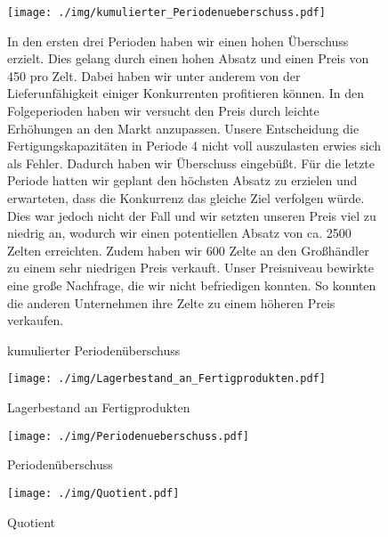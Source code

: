 \documentclass[a4paper, 12pt]{report}
\begin{document}
\begin{flushleft}
 \begin{figure}
 \centering 
 \texttt{[image: ./img/kumulierter\_Periodenueberschuss.pdf]}
  \caption[kumulierter Periodenüberschuss]
  {kumulierter Periodenüberschuss}
  \begin{flushleft}
In den ersten drei Perioden haben wir einen hohen Überschuss erzielt.
Dies gelang durch einen hohen Absatz und einen Preis von 450\texteuro{} pro Zelt. 
Dabei haben wir unter anderem von der Lieferunfähigkeit einiger Konkurrenten profitieren können.
In den Folgeperioden haben wir versucht den Preis durch leichte Erhöhungen an den Markt anzupassen.
Unsere Entscheidung die Fertigungskapazitäten in Periode 4 nicht voll auszulasten erwies sich als Fehler.
Dadurch haben wir Überschuss eingebüßt. 
Für die letzte Periode hatten wir geplant den höchsten Absatz zu erzielen und erwarteten, dass die Konkurrenz das gleiche Ziel verfolgen würde.
Dies war jedoch nicht der Fall und wir setzten unseren Preis viel zu niedrig an, wodurch wir einen potentiellen Absatz von ca. 2500 Zelten erreichten.
Zudem haben wir 600 Zelte an den Großhändler zu einem sehr niedrigen Preis verkauft.
Unser Preisniveau bewirkte eine große Nachfrage, die wir nicht befriedigen konnten.
So konnten die anderen Unternehmen ihre Zelte zu einem höheren Preis verkaufen.
  \end{flushleft}
\end{figure}

 \begin{figure}
 \centering 
 \texttt{[image: ./img/Lagerbestand\_an\_Fertigprodukten.pdf]}
  \caption[Lagerbestand an Fertigprodukten]{Lagerbestand an Fertigprodukten}
\end{figure}

\begin{figure}
 \centering 
 \texttt{[image: ./img/Periodenueberschuss.pdf]}
  \caption[Periodenüberschuss]{Periodenüberschuss}
\end{figure}
 
 \begin{figure}[b]
 \centering 
 \texttt{[image: ./img/Quotient.pdf]}
  \caption[Quotient]{Quotient}
\end{figure}

 



\end{flushleft}
\end{document}
